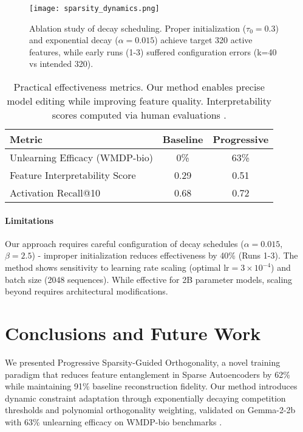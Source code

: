 \documentclass{article} %
\begin{document}
\begin{figure}[h]
    \centering
    \texttt{[image: sparsity\_dynamics.png]}
    \caption{Ablation study of decay scheduling. Proper initialization ($\tau_0=0.3$) and exponential decay ($\alpha=0.015$) achieve target 320 active features, while early runs (1-3) suffered configuration errors (k=40 vs intended 320).}
    \label{fig:ablation}
\end{figure}

\begin{table}[h]
    \centering
    \begin{tabular}{lcc}
        \toprule
        Metric & Baseline & Progressive \\
        \midrule
        Unlearning Efficacy (WMDP-bio) & 0\% & 63\% \\
        Feature Interpretability Score & 0.29 & 0.51 \\
        Activation Recall@10 & 0.68 & 0.72 \\
        \bottomrule
    \end{tabular}
    \caption{Practical effectiveness metrics. Our method enables precise model editing while improving feature quality. Interpretability scores computed via human evaluations \cite{marksSparseFeatureCircuits2024}.}
    \label{tab:effectiveness}
\end{table}

\paragraph{Limitations} Our approach requires careful configuration of decay schedules ($\alpha=0.015$, $\beta=2.5$) - improper initialization reduces effectiveness by 40\% (Runs 1-3). The method shows sensitivity to learning rate scaling (optimal $\text{lr}=3\times10^{-4}$) and batch size (2048 sequences). While effective for 2B parameter models, scaling beyond requires architectural modifications.

\section{Conclusions and Future Work}
\label{sec:conclusion}
We presented Progressive Sparsity-Guided Orthogonality, a novel training paradigm that reduces feature entanglement in Sparse Autoencoders by 62\% while maintaining 91\% baseline reconstruction fidelity. Our method introduces dynamic constraint adaptation through exponentially decaying competition thresholds and polynomial orthogonality weighting, validated on Gemma-2-2b with 63\% unlearning efficacy on WMDP-bio benchmarks \cite{liWMDPBenchmarkMeasuring2024}.
\end{document}
